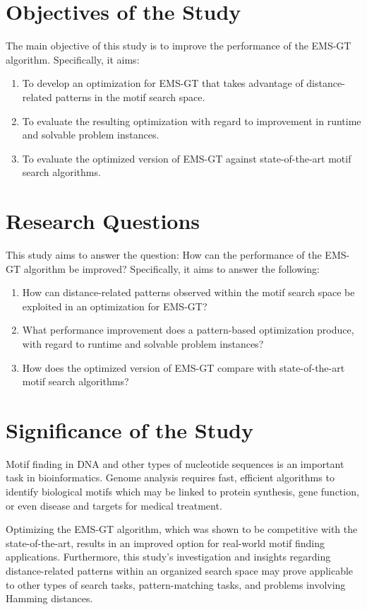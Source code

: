 \documentclass[oneside,12pt]{DISCSthesis}
\begin{document}
	\section{Objectives of the Study}
		The main objective of this study is to improve the performance of the EMS-GT algorithm. Specifically, it aims:
		\begin{enumerate}
		\item To develop an optimization for EMS-GT that takes advantage of distance-related patterns in the motif search space.
		\item To evaluate the resulting optimization with regard to improvement in runtime and solvable problem instances.
		\item To evaluate the optimized version of EMS-GT against state-of-the-art motif search algorithms.
		\end{enumerate}

	\section{Research Questions}
		This study aims to answer the question: How can the performance of the EMS-GT algorithm be improved?
		Specifically, it aims to answer the following:

		\begin{enumerate}
		\item How can distance-related patterns observed within the motif search space be exploited in an optimization for EMS-GT?
		\item What performance improvement does a pattern-based optimization produce, with regard to runtime and solvable problem instances?
		\item How does the optimized version of EMS-GT compare with state-of-the-art motif search algorithms?
		\end{enumerate}

	\section{Significance of the Study}
		Motif finding in DNA and other types of nucleotide sequences is an important task in bioinformatics. Genome analysis requires fast, efficient algorithms to identify biological motifs which may be linked to protein synthesis, gene function, or even disease and targets for medical treatment. 

		Optimizing the EMS-GT algorithm, which was shown to be competitive with the state-of-the-art, results in an improved option for real-world motif finding applications. Furthermore, this study's investigation and insights regarding distance-related patterns within an organized search space may prove applicable to other types of search tasks, pattern-matching tasks, and problems involving Hamming distances.
\end{document}

